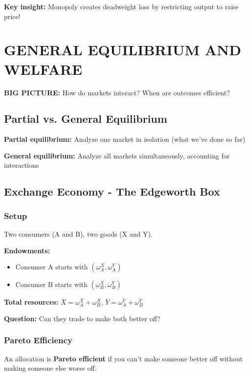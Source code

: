\documentclass[10pt,letterpaper]{article}
\begin{document}
\textbf{Key insight:} Monopoly creates deadweight loss by restricting output to raise price!

\newpage

\section{GENERAL EQUILIBRIUM AND WELFARE}

\begin{criticalbox}
\textbf{BIG PICTURE:} How do markets interact? When are outcomes efficient?
\end{criticalbox}

\subsection{Partial vs. General Equilibrium}

\textbf{Partial equilibrium:} Analyze one market in isolation (what we've done so far)

\textbf{General equilibrium:} Analyze all markets simultaneously, accounting for interactions

\subsection{Exchange Economy - The Edgeworth Box}

\subsubsection{Setup}

Two consumers (A and B), two goods (X and Y).

\textbf{Endowments:}
\begin{itemize}
  \item Consumer A starts with $(\omega_A^X, \omega_A^Y)$
  \item Consumer B starts with $(\omega_B^X, \omega_B^Y)$
\end{itemize}

\textbf{Total resources:} $\bar{X} = \omega_A^X + \omega_B^X$, $\bar{Y} = \omega_A^Y + \omega_B^Y$

\textbf{Question:} Can they trade to make both better off?

\subsubsection{Pareto Efficiency}

An allocation is \textbf{Pareto efficient} if you can't make someone better off without making someone else worse off.
\end{document}
